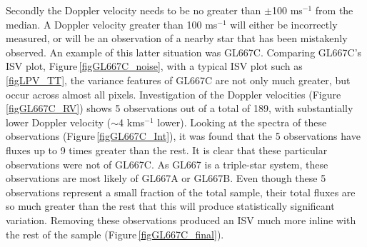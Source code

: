 Secondly the Doppler velocity needs to be no greater than $\pm$100 ms$^{-1}$ from the median. A Doppler velocity greater than 100 ms$^{-1}$ will either be incorrectly measured, or will be an observation of a nearby star that has been mistakenly observed. An example of this latter situation was GL667C. Comparing GL667C's ISV plot, Figure\,\ref{figGL667C_noise}, with a typical ISV plot such as  \ref{figLPV_TT}, the variance features of GL667C are not only much greater, but occur across almost all pixels. Investigation of the Doppler velocities (Figure\,\ref{figGL667C_RV}) shows 5 observations out of a total of 189, with substantially lower Doppler velocity ($\sim$4 kms$^{-1}$ lower). Looking at the spectra of these observations (Figure\,\ref{figGL667C_Int}), it was found that the 5 observations have fluxes up to 9 times greater than the rest. It is clear that these particular observations were not of GL667C. As GL667 is a triple-star system, these observations are most likely of GL667A or GL667B. Even though these 5 observations represent a small fraction of the total sample, their total fluxes are so much greater than the rest that this will produce statistically significant variation. Removing these observations produced an ISV much more inline with the rest of the sample (Figure\,\ref{figGL667C_final}).\\

